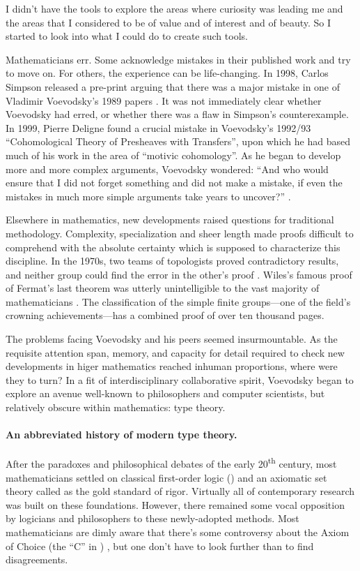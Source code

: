 \documentclass[12pt,twoside]{reedthesis}
\begin{document}
\setlength{\epigraphwidth}{0.8\textwidth}
\epigraph{I didn’t have the tools to explore the areas where curiosity was
  leading me and the areas that I considered to be of value and of interest and
  of beauty. So I started to look into what I could do to create such tools.}{\cite{voevodsky-ias}}

Mathematicians err. Some acknowledge mistakes in their published work and
try to move on. For others, the experience can be life-changing. In 1998, Carlos
Simpson released a pre-print arguing that there was a major mistake in one of
Vladimir Voevodsky's 1989 papers \cite{voevodsky-presentation}. It was not
immediately clear whether Voevodsky had erred, or whether there was a flaw in
Simpson's counterexample. In 1999, Pierre Deligne found a crucial mistake in
Voevodsky's 1992/93 ``Cohomological Theory of Presheaves with Transfers'', upon
which he had based much of his work in the area of ``motivic cohomology''. As he
began to develop more and more complex arguments, Voevodsky wondered: ``And who
would ensure that I did not forget something and did not make a mistake, if even
the mistakes in much more simple arguments take years to uncover?''
\cite{voevodsky-ias}.

Elsewhere in mathematics, new developments raised questions for traditional
methodology. Complexity, specialization and sheer length made
proofs difficult to comprehend with the absolute certainty which is
supposed to characterize this discipline. In the 1970s, two teams of
topologists proved contradictory results, and neither group could find the error
in the other's proof \cite{kolata}. Wiles's famous proof of Fermat's last
theorem was utterly unintelligible to the vast majority of mathematicians
\cite{nyt}. The classification of the simple finite groups---one of the field's
crowning achievements---has a combined proof of over ten thousand pages.

The problems facing Voevodsky and his peers seemed insurmountable.
As the requisite attention span, memory, and capacity for detail required to
check new developments in higer mathematics reached inhuman proportions,
where were they to turn? In a fit of interdisciplinary collaborative spirit,
Voevodsky began to explore an avenue well-known to philosophers and computer
scientists, but relatively obscure within mathematics: type theory.

\paragraph{An abbreviated history of modern type theory.} After the paradoxes
and philosophical debates of the early 20\textsuperscript{th} century, most
mathematicians settled on classical first-order logic (\FOL{}) and an axiomatic
set theory called \ZFC{} as the gold standard of rigor. Virtually all of
contemporary research was built on these foundations. However, there remained
some vocal opposition by logicians and philosophers to these newly-adopted
methods. Most mathematicians are dimly aware that there's some controversy about
the Axiom of Choice (the ``C'' in \ZFC{}) \cite{martin-lof-100-years}, but one
don't have to look further than \FOL{} to find disagreements.
\end{document}
